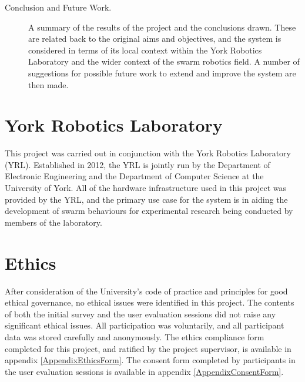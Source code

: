 \begin{description}
 \item [Conclusion and Future Work.] A summary of the results of the project and the conclusions drawn. These are related back to the original aims and objectives, and the system is considered in terms of its local context within the York Robotics Laboratory and the wider context of the swarm robotics field. A number of suggestions for possible future work to extend and improve the system are then made.
\end{description}


\section{York Robotics Laboratory}
This project was carried out in conjunction with the York Robotics Laboratory (YRL). Established in 2012, the YRL is jointly run by the Department of Electronic Engineering and the Department of Computer Science at the University of York. All of the hardware infrastructure used in this project was provided by the YRL, and the primary use case for the system is in aiding the development of swarm behaviours for experimental research being conducted by members of the laboratory.


\section{Ethics}
After consideration of the University's code of practice and principles for good ethical governance, no ethical issues were identified in this project. The contents of both the initial survey and the user evaluation sessions did not raise any significant ethical issues. All participation was voluntarily, and all participant data was stored carefully and anonymously. The ethics compliance form completed for this project, and ratified by the project supervisor, is available in appendix \ref{AppendixEthicsForm}. The consent form completed by participants in the user evaluation sessions is available in appendix \ref{AppendixConsentForm}.